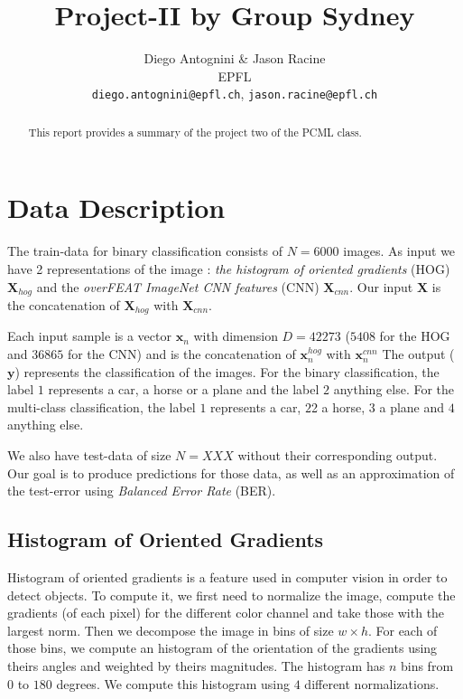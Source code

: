 \documentclass{article} %
\title{Project-II by Group Sydney}
\author{
Diego Antognini \& Jason Racine\\
EPFL \\
\texttt{diego.antognini@epfl.ch}, \texttt{jason.racine@epfl.ch} \\
}
\begin{document}
\maketitle

\begin{abstract}
This report provides a summary of the project two of the PCML class. 
\end{abstract}

\section{Data Description}

The train-data for binary classification consists of $N = 6000$ images. As input we have 2 representations of the image : \textit{the histogram of oriented gradients} (HOG) $\mathbf{X}_{hog}$ and the \textit{overFEAT ImageNet CNN features} (CNN) $\mathbf{X}_{cnn}$. Our input $\mathbf{X}$ is the concatenation of $\mathbf{X}_{hog}$ with $\mathbf{X}_{cnn}$. 

Each input sample is a vector $\mathbf{x}_n$ with dimension $D = 42273$ ($5408$ for the HOG and $36865$ for the CNN) and is the concatenation of $\mathbf{x}_n^{hog}$ with $\mathbf{x}_n^{cnn}$
The output ($\mathbf{y}$) represents the classification of the images. For the binary classification, the label $1$  represents a car, a horse or a plane and the label $2$ anything else. For the multi-class classification, the label $1$ represents a car, $2$2 a horse, $3$ a plane and $4$ anything else.

We also have test-data of size $N=XXX$ without their corresponding output. Our goal is to produce predictions for those data, as well as an approximation of the test-error using \textit{Balanced Error Rate} (BER).

\subsection{Histogram of Oriented Gradients}

Histogram of oriented gradients is a feature used in computer vision in order to detect objects. To compute it, we first need to normalize the image, compute the gradients (of each pixel) for the different color channel and take those with the largest norm. Then we decompose the image in bins of size $w \times h$. For each of those bins, we compute an histogram of the orientation of the gradients using theirs angles and weighted by theirs magnitudes. The histogram has $n$ bins from $0$ to $180$ degrees. We compute this histogram using $4$ different normalizations.
\end{document}
